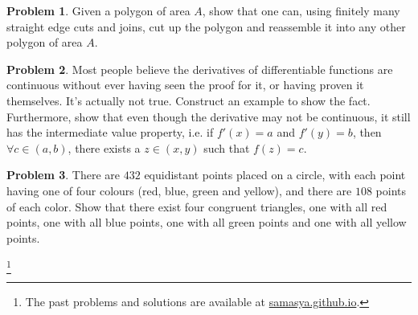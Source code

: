 \documentclass[10pt,a4paper,notitlepage]{article}
\theoremstyle{definition}
\newtheorem{prob}{Problem}
\newcommand\blfootnote[1]{%
  \begingroup
  \renewcommand\thefootnote{}\footnote{#1}%
  \addtocounter{footnote}{-1}%
  \endgroup
}
\begin{document}
\begin{prob}
Given a polygon of area $A$, show that one can, using finitely many straight edge cuts and joins, cut up the polygon and reassemble it into any other polygon of area $A$.
\end{prob}

\begin{prob}
Most people believe the derivatives of differentiable functions are continuous without ever having seen the proof for it, or having proven it themselves. It's actually not true. Construct an example to show the fact. Furthermore, show that even though the derivative may not be continuous, it still has the intermediate value property, i.e. if $f'(x)=a$ and $f'(y)=b$, then $\forall c \in (a,b)$, there exists a $z \in (x,y)$ such that $f(z)=c$.
\end{prob}

\begin{prob}
There are $432$ equidistant points placed on a circle, with each point having one of four colours (red, blue, green and yellow), and there are $108$ points of each color. Show that there exist four congruent triangles, one with all red points, one with all blue points, one with all green points and one with all yellow points.
\end{prob}

\blfootnote{The past problems and solutions are available at \href{http://samasya.github.io}{samasya.github.io}.}
\end{document}
